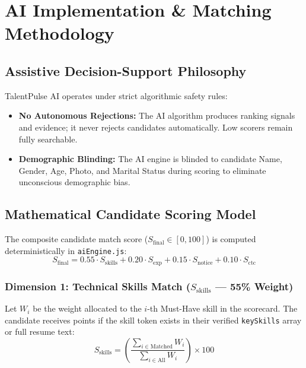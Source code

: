 \documentclass[11pt,a4paper,oneside]{report}
\begin{document}
\chapter{AI Implementation \& Matching Methodology}

\section{Assistive Decision-Support Philosophy}
TalentPulse AI operates under strict algorithmic safety rules:
\begin{itemize}[leftmargin=1.5em]
    \item \textbf{No Autonomous Rejections:} The AI algorithm produces ranking signals and evidence; it never rejects candidates automatically. Low scorers remain fully searchable.
    \item \textbf{Demographic Blinding:} The AI engine is blinded to candidate Name, Gender, Age, Photo, and Marital Status during scoring to eliminate unconscious demographic bias.
\end{itemize}

\section{Mathematical Candidate Scoring Model}
The composite candidate match score ($S_{\text{final}} \in [0, 100]$) is computed deterministically in \texttt{aiEngine.js}:
\begin{equation}
    S_{\text{final}} = 0.55 \cdot S_{\text{skills}} + 0.20 \cdot S_{\text{exp}} + 0.15 \cdot S_{\text{notice}} + 0.10 \cdot S_{\text{ctc}}
\end{equation}

\subsection{Dimension 1: Technical Skills Match ($S_{\text{skills}}$ --- 55\% Weight)}
Let $W_i$ be the weight allocated to the $i$-th Must-Have skill in the scorecard. The candidate receives points if the skill token exists in their verified \texttt{keySkills} array or full resume text:
\begin{equation}
    S_{\text{skills}} = \left( \frac{\sum_{i \in \text{Matched}} W_i}{\sum_{i \in \text{All}} W_i} \right) \times 100
\end{equation}
\end{document}
